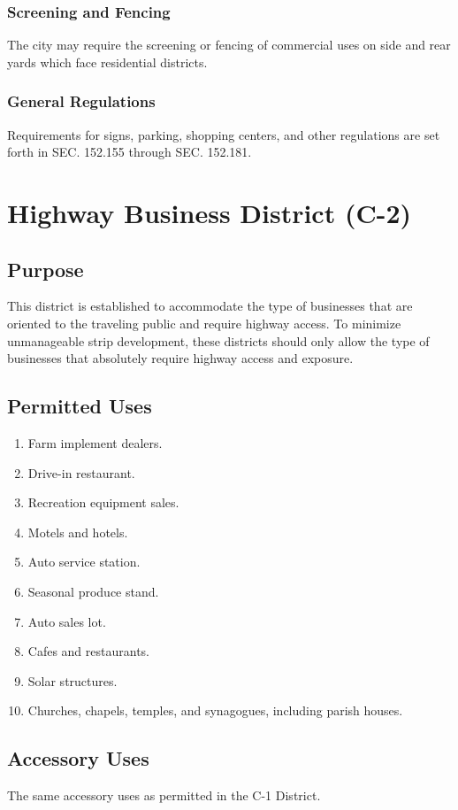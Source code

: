 \subsubsection{Screening and Fencing}
The city may require the screening or fencing of commercial uses on side and rear yards which face residential districts.
\subsubsection{General Regulations}
Requirements for signs, parking, shopping centers, and other regulations are set forth in SEC. 152.155 through SEC. 152.181.

\section{Highway Business District (C-2)}
\subsection{Purpose}
This district is established to accommodate the type of businesses that are oriented to the traveling public and require highway access. To minimize unmanageable strip development, these districts should only allow the type of businesses that absolutely require highway access and exposure.
\subsection{Permitted Uses}
\begin{enumerate}[{\indent}1)]
    \item Farm implement dealers.
    \item Drive-in restaurant.
    \item Recreation equipment sales.
    \item Motels and hotels.
    \item Auto service station.
    \item Seasonal produce stand.
    \item Auto sales lot.
    \item Cafes and restaurants.
    \item Solar structures.
    \item Churches, chapels, temples, and synagogues, including parish houses.
\end{enumerate}
\subsection{Accessory Uses}
The same accessory uses as permitted in the C-1 District.
